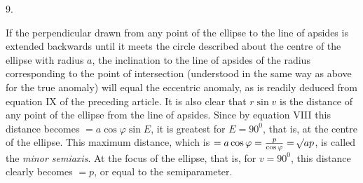 \par{}
\begin{center}
9.
\end{center}
If the perpendicular drawn from any point of the ellipse to the line of apsides is
extended backwards until it meets the circle described about the centre of the ellipse
with radius $a$, the inclination to the line of apsides of the radius corresponding to
the point of intersection (understood in the same way as above for the true anomaly)
will equal the eccentric anomaly, as is readily deduced from equation IX of the
preceding article. It is also clear that $r\sin v$ is the distance of any point of
the ellipse from the line of apsides. Since by equation VIII this distance becomes
$= a\cos\varphi\sin E$, it is greatest for $E = 90^0$, that is, at the centre of the
ellipse. This maximum distance, which is
$= a\cos\varphi = \frac{p}{\cos\varphi} = \mathord{{}^{}\!\surd}ap$, is called the
\emph{minor semiaxis}. At the focus of the ellipse, that is, for $v = 90^0$, this
distance clearly becomes $= p$, or equal to the semiparameter.
